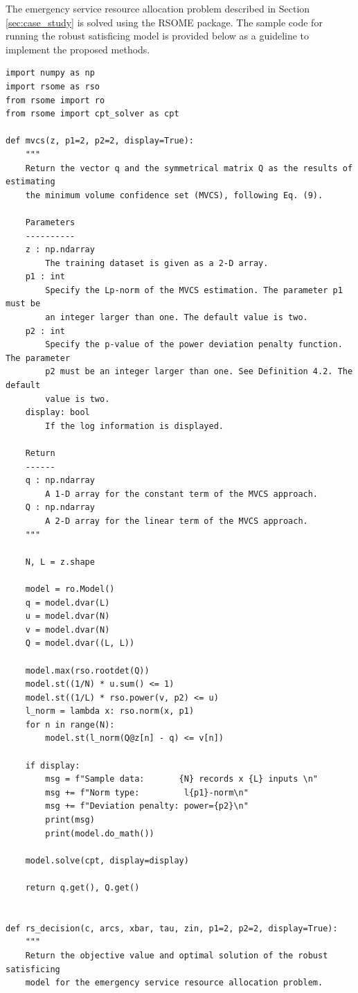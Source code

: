 \documentclass[opre, blindrev]{informs4}
\newcommand{\1}[1]{\mathds{1}{\left(#1\right)}}
\begin{document}
\begin{appendices}
The emergency service resource allocation problem described in Section \ref{sec:case_study} is solved using the RSOME package. The sample code for running the robust satisficing model is provided below as a guideline to implement the proposed methods.

\begin{lstlisting}
import numpy as np
import rsome as rso
from rsome import ro
from rsome import cpt_solver as cpt

def mvcs(z, p1=2, p2=2, display=True):
    """
    Return the vector q and the symmetrical matrix Q as the results of estimating
    the minimum volume confidence set (MVCS), following Eq. (9).

    Parameters
    ----------
    z : np.ndarray
        The training dataset is given as a 2-D array.
    p1 : int
        Specify the Lp-norm of the MVCS estimation. The parameter p1 must be
        an integer larger than one. The default value is two.
    p2 : int
        Specify the p-value of the power deviation penalty function. The parameter
        p2 must be an integer larger than one. See Definition 4.2. The default
        value is two.
    display: bool
        If the log information is displayed.

    Return
    ------
    q : np.ndarray
        A 1-D array for the constant term of the MVCS approach.
    Q : np.ndarray
        A 2-D array for the linear term of the MVCS approach.
    """

    N, L = z.shape

    model = ro.Model()
    q = model.dvar(L)
    u = model.dvar(N)
    v = model.dvar(N)
    Q = model.dvar((L, L))

    model.max(rso.rootdet(Q))
    model.st((1/N) * u.sum() <= 1)
    model.st((1/L) * rso.power(v, p2) <= u)
    l_norm = lambda x: rso.norm(x, p1)
    for n in range(N):
        model.st(l_norm(Q@z[n] - q) <= v[n])

    if display:
        msg = f"Sample data:       {N} records x {L} inputs \n"
        msg += f"Norm type:         l{p1}-norm\n"
        msg += f"Deviation penalty: power={p2}\n"
        print(msg)
        print(model.do_math())

    model.solve(cpt, display=display)

    return q.get(), Q.get()


def rs_decision(c, arcs, xbar, tau, zin, p1=2, p2=2, display=True):
    """
    Return the objective value and optimal solution of the robust satisficing
    model for the emergency service resource allocation problem.


\end{lstlisting}
\end{appendices}
\end{document}

